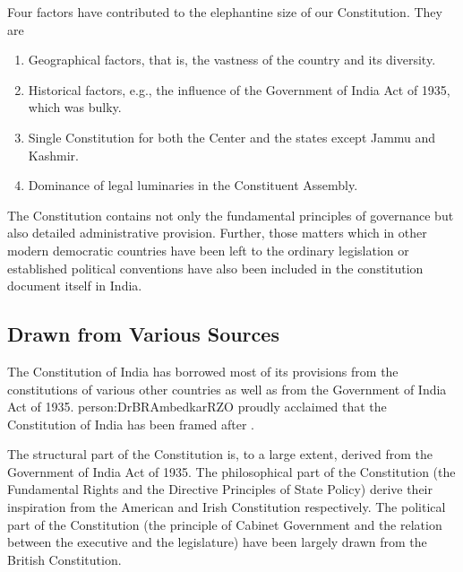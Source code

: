 Four factors have contributed to the elephantine size of our Constitution. They are

\renewcommand{\labelenumi}{\textbf{(\alph{enumi})}}
\begin{enumerate}
  \item Geographical factors, that is, the vastness of the country and its diversity.
  \item Historical factors, e.g., the influence of the Government of India Act of 1935, which was bulky.
  \item Single Constitution for both the Center and the states except Jammu and Kashmir.
  \item Dominance of legal luminaries in the Constituent Assembly.
\end{enumerate}

The Constitution contains not only the fundamental principles of governance but also detailed administrative provision. Further, those matters which in other modern democratic countries have been left to the ordinary legislation or established political conventions have also been included in the constitution document itself in India.

\subsection{Drawn from Various Sources}

The Constitution of India has borrowed most of its provisions from the constitutions of various other countries as well as from the Government of India Act of 1935. \gls{person:DrBRAmbedkarRZO} proudly acclaimed that the Constitution of India has been framed after .

The structural part of the Constitution is, to a large extent, derived from the Government of India Act of 1935. The philosophical part of the Constitution (the Fundamental Rights and the Directive Principles of State Policy) derive their inspiration from the American and Irish Constitution respectively. The political part of the Constitution (the principle of Cabinet Government and the relation between the executive and the legislature) have been largely drawn from the British Constitution.

